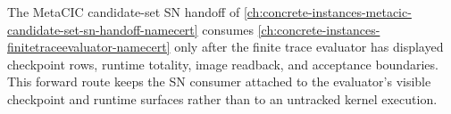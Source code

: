 The MetaCIC candidate-set SN handoff of \autoref{ch:concrete-instances-metacic-candidate-set-sn-handoff-namecert} consumes \autoref{ch:concrete-instances-finitetraceevaluator-namecert} only after the finite trace evaluator has displayed checkpoint rows, runtime totality, image readback, and acceptance boundaries. This forward route keeps the SN consumer attached to the evaluator's visible checkpoint and runtime surfaces rather than to an untracked kernel execution.

